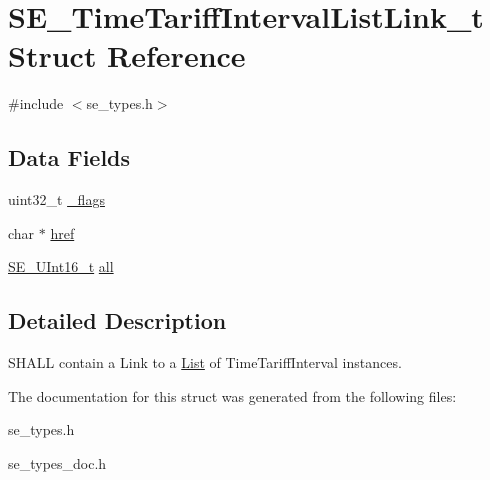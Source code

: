 \hypertarget{structSE__TimeTariffIntervalListLink__t}{}\section{S\+E\+\_\+\+Time\+Tariff\+Interval\+List\+Link\+\_\+t Struct Reference}
\label{structSE__TimeTariffIntervalListLink__t}


{\ttfamily \#include $<$se\+\_\+types.\+h$>$}

\subsection*{Data Fields}
\begin{DoxyCompactItemize}
\item 
uint32\+\_\+t \hyperlink{group__TimeTariffIntervalListLink_ga2a55ec60c5a306cb112d2d74e49860da}{\+\_\+flags}
\item 
char $\ast$ \hyperlink{group__TimeTariffIntervalListLink_gac4b91b5f652299407cdbb8ba7fe8ccc3}{href}
\item 
\hyperlink{group__UInt16_gac68d541f189538bfd30cfaa712d20d29}{S\+E\+\_\+\+U\+Int16\+\_\+t} \hyperlink{group__TimeTariffIntervalListLink_ga56259e3393d2f64589745a17b0887283}{all}
\end{DoxyCompactItemize}


\subsection{Detailed Description}
S\+H\+A\+LL contain a Link to a \hyperlink{structList}{List} of Time\+Tariff\+Interval instances. 

The documentation for this struct was generated from the following files\+:\begin{DoxyCompactItemize}
\item 
se\+\_\+types.\+h\item 
se\+\_\+types\+\_\+doc.\+h\end{DoxyCompactItemize}
